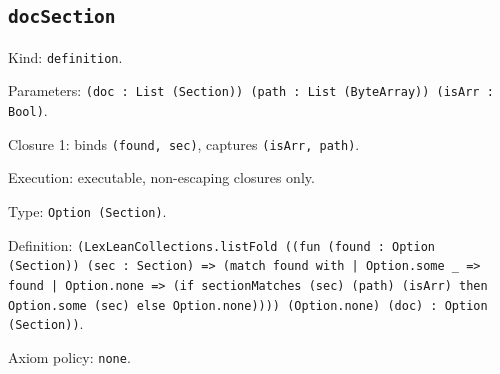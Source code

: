 \documentclass[11pt]{article}
\begin{document}
\subsection*{\texttt{docSection}}
\noindent Kind: \texttt{definition}.\par
\noindent Parameters: \texttt{(doc : List (Section)) (path : List (ByteArray)) (isArr : Bool)}.\par
\noindent Closure 1: binds \texttt{(found, sec)}, captures \texttt{(isArr, path)}.\par
\noindent Execution: executable, non-escaping closures only.\par
\noindent Type: \texttt{Option (Section)}.\par
\noindent Definition: \texttt{(LexLeanCollections.listFold ((fun (found : Option (Section)) (sec : Section) => (match found with | Option.some \_ => found | Option.none => (if sectionMatches (sec) (path) (isArr) then Option.some (sec) else Option.none)))) (Option.none) (doc) : Option (Section))}.\par
\noindent Axiom policy: \texttt{none}.\par
\end{document}
